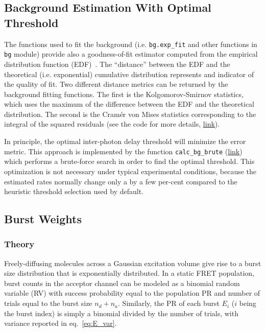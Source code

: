 \documentclass[10pt,letterpaper]{article}
\begin{document}
\subsection{Background Estimation With Optimal Threshold}
\label{sec:bg_opt_th}
The functions used to fit the background (i.e. \verb|bg.exp_fit| and other functions in \verb|bg| module)
provide also a goodness-of-fit estimator 
computed from the empirical distribution function (EDF)~\cite{Stephens1974,Parr1980}. 
The ``distance'' between the EDF and the theoretical (i.e. exponential) cumulative distribution
represents and indicator of the quality of fit.
Two different distance metrics can be returned by the background fitting functions.
The first is the Kolgomorov-Smirnov statistics, which uses the maximum of the difference 
between the EDF and the theoretical distribution. The second is the Cramér von Mises
statistics corresponding to the integral of the squared residuals
(see the code for more details,
\href{https://github.com/tritemio/FRETBursts/blob/master/fretbursts/background.py#L43}{link}).

In principle, the optimal inter-photon delay threshold will minimize
the error metric. This approach is implemented by the function \verb|calc_bg_brute|
(\href{http://fretbursts.readthedocs.org/en/latest/plugins.html#fretbursts.burstlib_ext.calc_bg_brute}{link}) which performs a brute-force search in order to find the optimal threshold.
This optimization is not necessary under typical experimental conditions, 
because the estimated rates normally change only a by a few per-cent 
compared to the heuristic threshold selection used by default.


\subsection{Burst Weights}
\label{sec:burstweights_theory}
\subsubsection{Theory}
Freely-diffusing molecules across 
a Gaussian excitation volume give rise to 
a burst size distribution that is exponentially distributed.
In a static FRET population, burst counts in the acceptor channel can be
modeled as a binomial random variable (RV) with success probability equal to the
population PR and number of trials equal to the burst size $n_d + n_a$.
Similarly, the PR of each burst $E_i$ ($i$ being the burst index) is 
simply a binomial divided by the number of trials, with variance reported
in eq.~\ref{eq:E_var}.
\end{document}
